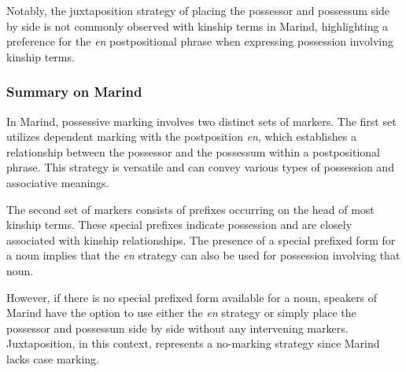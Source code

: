 Notably, the juxtaposition strategy of placing the possessor and possessum side by side is not commonly observed with kinship terms in Marind, highlighting a preference for the \textit{en} postpositional phrase when expressing possession involving kinship terms.

\subsubsection*{Summary on Marind}

In Marind, possessive marking involves two distinct sets of markers. The first set utilizes dependent marking with the postposition \textit{en}, which establishes a relationship between the possessor and the possessum within a postpositional phrase. This strategy is versatile and can convey various types of possession and associative meanings.

The second set of markers consists of prefixes occurring on the head of most kinship terms. These special prefixes indicate possession and are closely associated with kinship relationships. The presence of a special prefixed form for a noun implies that the \textit{en} strategy can also be used for possession involving that noun.

However, if there is no special prefixed form available for a noun, speakers of Marind have the option to use either the \textit{en} strategy or simply place the possessor and possessum side by side without any intervening markers. Juxtaposition, in this context, represents a no-marking strategy since Marind lacks case marking.


\printglosses[style=mcolblock]

\printbibliography
 
